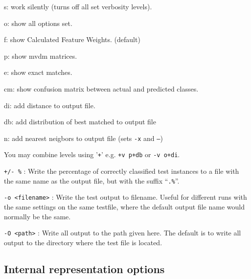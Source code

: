 \documentclass{report}
\begin{document}
\begin{description}
	\begin{description}
         \item s:  work silently (turns off all set verbosity levels).
         \item o:  show all options set.
         \item f:  show Calculated Feature Weights. (default)
         \item p:  show {\sc mvdm} matrices.
         \item e:  show exact matches.
	 \item cm: show confusion matrix between actual and predicted classes.
         \item di: add distance to output file.
         \item db: add distribution of best matched to output file
         \item n:  add nearest neigbors to output file (sets {\tt -x}
         and {\tt --})
	\item You may combine levels using '{\tt +}' e.g. {\tt +v
         p+db} or {\tt -v o+di}.
	\end{description}

\item {\tt +/- \%} : Write the percentage of correctly classified test
                 instances to a file with the same name as the output
                 file, but with the suffix ``{\tt .\%}''.

\item {\tt -o <filename>} : Write the test output to filename. Useful
for different runs with the same settings on the same testfile, where
the default output file name would normally be the same.

\item {\tt -O <path>} : Write all output to the path given here. The
default is to write all output to the directory where the test file
is located.

\end{description}

\subsection{Internal representation options}
\end{document}
